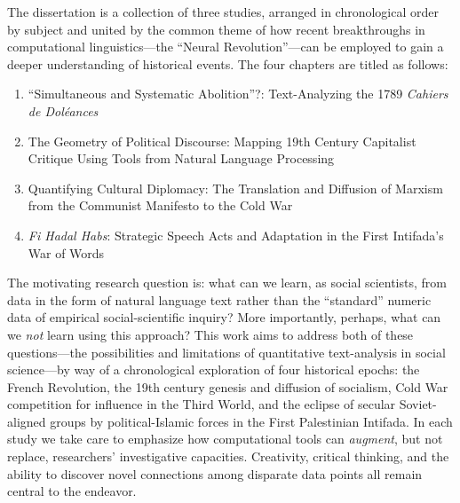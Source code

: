 
The dissertation is a collection of three studies, arranged in chronological order by subject and united by the common theme of how recent breakthroughs in computational linguistics---the ``Neural Revolution''---can be employed to gain a deeper understanding of historical events. The four chapters are titled as follows:

\begin{enumerate}
\item ``Simultaneous and Systematic Abolition''?: Text-Analyzing the 1789 \textit{Cahiers de Dol\'{e}ances}
\item The Geometry of Political Discourse: Mapping 19th Century Capitalist Critique Using Tools from Natural Language Processing
\item Quantifying Cultural Diplomacy: The Translation and Diffusion of Marxism from the Communist Manifesto to the Cold War
\item \textit{Fi Hadal Habs}: Strategic Speech Acts and Adaptation in the First Intifada's War of Words
\end{enumerate}

The motivating research question is: what can we learn, as social scientists, from data in the form of natural language text rather than the ``standard'' numeric data of empirical social-scientific inquiry? More importantly, perhaps, what can we \textit{not} learn using this approach? This work aims to address both of these questions---the possibilities and limitations of quantitative text-analysis in social science---by way of a chronological exploration of four historical epochs: the French Revolution, the 19th century genesis and diffusion of socialism, Cold War competition for influence in the Third World, and the eclipse of secular Soviet-aligned groups by political-Islamic forces in the First Palestinian Intifada. In each study we take care to emphasize how computational tools can \textit{augment}, but not replace, researchers' investigative capacities. Creativity, critical thinking, and the ability to discover novel connections among disparate data points all remain central to the endeavor.